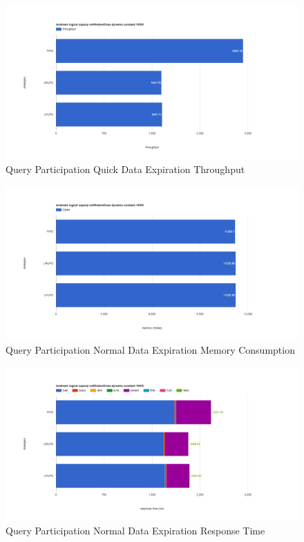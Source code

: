 \begin{figure}[!htbp]
	\centering
    \includegraphics[width=6.5in]{img/app3-qp-quick-t.png}
    \caption{Query Participation Quick Data Expiration Throughput}
\end{figure}
\begin{figure}[!htbp]
	\centering
    \includegraphics[width=6.5in]{img/app3-qp-normal-m.png}
    \caption{Query Participation Normal Data Expiration Memory Consumption}
\end{figure}
\begin{figure}[!htbp]
	\centering
    \includegraphics[width=6.5in]{img/app3-qp-normal-r.png}
    \caption{Query Participation Normal Data Expiration Response Time}
\end{figure}
